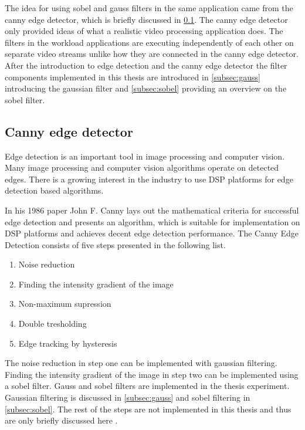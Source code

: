 The idea for using sobel and gauss filters in the same application came from the canny edge detector, which is briefly discussed in \ref{subsec:canny}. The canny edge detector only provided ideas of what a realistic video processing application does. The filters in the workload applications are executing independently of each other on separate video streams unlike how they are connected in the canny edge detector. After the introduction to edge detection and the canny edge detector the filter components implemented in this thesis are introduced in \ref{subsec:gauss} introducing the gaussian filter and \ref{subsec:sobel} providing an overview on the sobel filter.\\


\subsection{Canny edge detector}
\label{subsec:canny}
Edge detection is an important tool in image processing and computer vision. Many image processing and computer vision algorithms operate on detected edges. There is a growing interest in the industry to use DSP platforms for edge detection based algorithms.

In his 1986 paper John F. Canny \cite{canny1986computational} lays out the mathematical criteria for successful edge detection and presents an algorithm, which is suitable for implementation on DSP platforms and achieves decent edge detection performance. The Canny Edge Detection consists of five steps presented in the following list.

\begin{enumerate}
    \item{Noise reduction}
    \item{Finding the intensity gradient of the image}
    \item{Non-maximum supression}
    \item{Double tresholding}
    \item{Edge tracking by hysteresis}
\end{enumerate}

The noise reduction in step one can be implemented with gaussian filtering. Finding the intensity gradient of the image in step two can be implemented using a sobel filter. Gauss and sobel filters are implemented in the thesis experiment. Gaussian filtering is discussed in \ref{subsec:gauss} and sobel filtering in \ref{subsec:sobel}. The rest of the steps are not implemented in this thesis and thus are only briefly discussed here .

